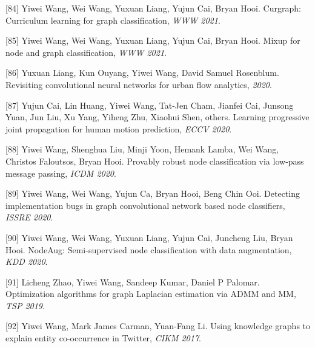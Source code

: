 [84] Yiwei Wang, Wei Wang, Yuxuan Liang, Yujun Cai, Bryan Hooi. Curgraph: Curriculum learning for graph classification, \textit{WWW 2021}.

[85] Yiwei Wang, Wei Wang, Yuxuan Liang, Yujun Cai, Bryan Hooi. Mixup for node and graph classification, \textit{WWW 2021}.

[86] Yuxuan Liang, Kun Ouyang, Yiwei Wang, David Samuel Rosenblum. Revisiting convolutional neural networks for urban flow analytics, \textit{ 2020}.

[87] Yujun Cai, Lin Huang, Yiwei Wang, Tat-Jen Cham, Jianfei Cai, Junsong Yuan, Jun Liu, Xu Yang, Yiheng Zhu, Xiaohui Shen, others. Learning progressive joint propagation for human motion prediction, \textit{ECCV 2020}.

[88] Yiwei Wang, Shenghua Liu, Minji Yoon, Hemank Lamba, Wei Wang, Christos Faloutsos, Bryan Hooi. Provably robust node classification via low-pass message passing, \textit{ICDM 2020}.

[89] Yiwei Wang, Wei Wang, Yujun Ca, Bryan Hooi, Beng Chin Ooi. Detecting implementation bugs in graph convolutional network based node classifiers, \textit{ISSRE 2020}.

[90] Yiwei Wang, Wei Wang, Yuxuan Liang, Yujun Cai, Juncheng Liu, Bryan Hooi. NodeAug: Semi-supervised node classification with data augmentation, \textit{KDD 2020}.

[91] Licheng Zhao, Yiwei Wang, Sandeep Kumar, Daniel P Palomar. Optimization algorithms for graph Laplacian estimation via ADMM and MM, \textit{TSP 2019}.

[92] Yiwei Wang, Mark James Carman, Yuan-Fang Li. Using knowledge graphs to explain entity co-occurrence in Twitter, \textit{CIKM 2017}.